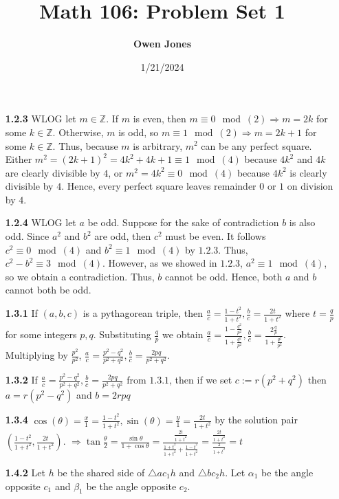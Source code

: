 \documentclass[10pt]{article}
\title{\bf Math 106: Problem Set 1}
\date{1/21/2024}
\author{\bf Owen Jones}
\begin{document}
\maketitle
\begin{enumerate}
    \item [\bf{1.2.3}] WLOG let $m\in\mathbb{Z}$. 
    If $m$ is even, then $m\equiv 0\mod(2)\Rightarrow m=2k$ for some $k\in\mathbb{Z}$.
    Otherwise, $m$ is odd, so $m\equiv 1\mod(2)\Rightarrow m=2k+1$ for some $k\in\mathbb{Z}$.
    Thus, because $m$ is arbitrary, $m^2$ can be any perfect square.
    Either $m^2={(2k+1)}^2=4k^2+4k+1\equiv 1\mod(4)$ because $4k^2$ and $4k$ are clearly divisible by $4$, or $m^2=4k^2\equiv 0\mod(4)$ because $4k^2$ is clearly divisible by $4$. 
    Hence, every perfect square leaves remainder $0$ or $1$ on division by $4$.
    \item [\bf{1.2.4}] WLOG let $a$ be odd. 
    Suppose for the sake of contradiction $b$ is also odd. 
    Since $a^2$ and $b^2$ are odd, then $c^2$ must be even. 
    It follows $c^2\equiv 0\mod(4)$ and $b^2\equiv 1\mod(4)$ by $\mathbf{1.2.3}$.
    Thus, $c^2-b^2\equiv 3\mod(4)$.
    However, as we showed in $\mathbf{1.2.3}$, $a^2\equiv 1\mod(4)$, so we obtain a contradiction.
    Thus, $b$ cannot be odd.
    Hence, both $a$ and $b$ cannot both be odd.
    \item [\bf{1.3.1}] If $(a,b,c)$ is a pythagorean triple, then $\frac{a}{c}=\frac{1-t^2}{1+t^2},\frac{b}{c}=\frac{2t}{1+t^2}$ where $t=\frac{q}{p}$ for some integers $p,q$. 
    Substituting $\frac{q}{p}$ we obtain $\frac{a}{c}=\frac{1-\frac{q^2}{p^2}}{1+\frac{q^2}{p^2}},\frac{b}{c}=\frac{2\frac{q}{p}}{1+\frac{q^2}{p^2}}$. 
    Multiplying by $\frac{p^2}{p^2}$, $\frac{a}{c}=\frac{p^2-q^2}{p^2+q^2},\frac{b}{c}=\frac{2pq}{p^2+q^2}$.
    \item [\bf{1.3.2}] If $\frac{a}{c}=\frac{p^2-q^2}{p^2+q^2},\frac{b}{c}=\frac{2pq}{p^2+q^2}$ from $\mathbf{1.3.1}$, then if we set $c:=r(p^2+q^2)$ then $a=r(p^2-q^2)$ and $b=2rpq$
    \item [\bf{1.3.4}] $\cos(\theta)=\frac{x}{1}=\frac{1-t^2}{1+t^2},\sin(\theta)=\frac{y}{1}=\frac{2t}{1+t^2}$ by the solution pair $(\frac{1-t^2}{1+t^2},\frac{2t}{1+t^2})$. $\Rightarrow \tan\frac{\theta}{2}=\frac{\sin\theta}{1+\cos\theta}=\frac{\frac{2t}{1+t^2}}{\frac{1+t^2}{1+t^2}+\frac{1-t^2}{1+t^2}}=\frac{\frac{2t}{1+t^2}}{\frac{2}{1+t^2}}=t$
    \item [\bf{1.4.2}] Let $h$ be the shared side of $\triangle ac_1h$ and $\triangle bc_2h$. 
    Let $\alpha_1$ be the angle opposite $c_1$ and $\beta_1$ be the angle opposite $c_2$. 

\end{enumerate}
\end{document}
